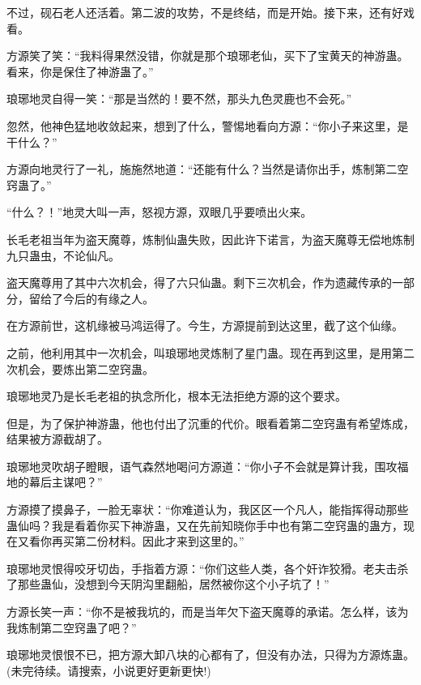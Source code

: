 \begin{this_body}
不过，砚石老人还活着。第二波的攻势，不是终结，而是开始。接下来，还有好戏看。

方源笑了笑：“我料得果然没错，你就是那个琅琊老仙，买下了宝黄天的神游蛊。看来，你是保住了神游蛊了。”

琅琊地灵自得一笑：“那是当然的！要不然，那头九色灵鹿也不会死。”

忽然，他神色猛地收敛起来，想到了什么，警惕地看向方源：“你小子来这里，是干什么？”

方源向地灵行了一礼，施施然地道：“还能有什么？当然是请你出手，炼制第二空窍蛊了。”

“什么？！”地灵大叫一声，怒视方源，双眼几乎要喷出火来。

长毛老祖当年为盗天魔尊，炼制仙蛊失败，因此许下诺言，为盗天魔尊无偿地炼制九只蛊虫，不论仙凡。

盗天魔尊用了其中六次机会，得了六只仙蛊。剩下三次机会，作为遗藏传承的一部分，留给了今后的有缘之人。

在方源前世，这机缘被马鸿运得了。今生，方源提前到达这里，截了这个仙缘。

之前，他利用其中一次机会，叫琅琊地灵炼制了星门蛊。现在再到这里，是用第二次机会，要炼出第二空窍蛊。

琅琊地灵乃是长毛老祖的执念所化，根本无法拒绝方源的这个要求。

但是，为了保护神游蛊，他也付出了沉重的代价。眼看着第二空窍蛊有希望炼成，结果被方源截胡了。

琅琊地灵吹胡子瞪眼，语气森然地喝问方源道：“你小子不会就是算计我，围攻福地的幕后主谋吧？”

方源摸了摸鼻子，一脸无辜状：“你难道认为，我区区一个凡人，能指挥得动那些蛊仙吗？我是看着你买下神游蛊，又在先前知晓你手中也有第二空窍蛊的蛊方，现在又看你再买第二份材料。因此才来到这里的。”

琅琊地灵恨得咬牙切齿，手指着方源：“你们这些人类，各个奸诈狡猾。老夫击杀了那些蛊仙，没想到今天阴沟里翻船，居然被你这个小子坑了！”

方源长笑一声：“你不是被我坑的，而是当年欠下盗天魔尊的承诺。怎么样，该为我炼制第二空窍蛊了吧？”

琅琊地灵恨恨不已，把方源大卸八块的心都有了，但没有办法，只得为方源炼蛊。(未完待续。请搜索，小说更好更新更快!)

\end{this_body}

